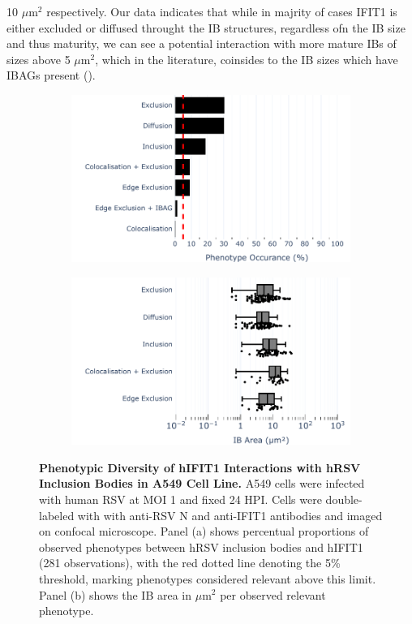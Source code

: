 10 \(\mu \mbox{m}^2\) respectively. Our data indicates that while in majrity of cases IFIT1 is either excluded or diffused throught the IB structures, regardless ofn the IB size and thus maturity, we can see a potential interaction with more mature IBs of sizes above 5 \(\mu \mbox{m}^2\), which in the literature, coinsides to the IB sizes which have IBAGs present (\cite{Rincheval2017FunctionalVirus}). 

\begin{figure}
    \begin{subfigure}{0.495\textwidth}
        \caption{}
        \includegraphics[width=1\linewidth]{08. Chapter 3/Figs/02. Infection/01. IFIT1/01. bar_i1_a549.pdf} 
    \end{subfigure}
    \begin{subfigure}{0.495\textwidth}
        \caption{}
        \includegraphics[width=1\linewidth]{08. Chapter 3/Figs/02. Infection/01. IFIT1/02. box_i1_a549.pdf}
    \end{subfigure}
    \caption[Phenotypic Diversity of hIFIT1 Interactions with hRSV Inclusion Bodies in A549 Cell Line.]{\textbf{Phenotypic Diversity of hIFIT1 Interactions with hRSV Inclusion Bodies in A549 Cell Line.} A549 cells were infected with human RSV at MOI 1 and fixed 24 HPI. Cells were double-labeled with with anti-RSV N and anti-IFIT1 antibodies and imaged on confocal microscope. Panel (a) shows percentual proportions of observed phenotypes between hRSV inclusion bodies and hIFIT1 (281 observations), with the red dotted line denoting the 5\% threshold, marking phenotypes considered relevant above this limit. Panel (b) shows the IB area in \(\mu \mbox{m}^2\) per observed relevant phenotype.}

\end{figure}
